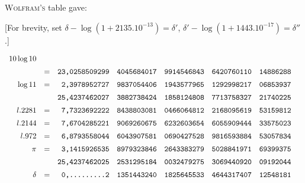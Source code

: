 \textsc{Wolfram's} table gave:

[For brevity, set $\delta-\log(1+2135.10^{-13})=\delta'$,
$\delta'-\log(1+1443.10^{-17})=\delta''$.]

\begingroup\footnotesize\setlength{\arraycolsep}{1pt}\renewcommand{\arraystretch}{1.12}\[
\begin{array}{rcrlllll}
10\log10&&&&&&&\\[5pt]
&=&\text{\ttfamily 23,0258509299}&\text{\ttfamily 4045684017}&\text{\ttfamily 9914546843}&\text{\ttfamily 6420760110}&\text{\ttfamily 14886288}&\\[5pt]
\log11&=&\text{\ttfamily 2,3978952727}&\text{\ttfamily 9837054406}&\text{\ttfamily 1943577965}&\text{\ttfamily 1292998217}&\text{\ttfamily 06853937}&\\[5pt]
&&\text{\ttfamily 25,4237462027}&\text{\ttfamily 3882738424}&\text{\ttfamily 1858124808}&\text{\ttfamily 7713758327}&\text{\ttfamily 21740225}&\\[5pt]
l.2281&=&\text{\ttfamily 7,7323692222}&\text{\ttfamily 8438803081}&\text{\ttfamily 0466064812}&\text{\ttfamily 2168095619}&\text{\ttfamily 53159812}&\\[5pt]
l.2144&=&\text{\ttfamily 7,6704285221}&\text{\ttfamily 9069260675}&\text{\ttfamily 6232603654}&\text{\ttfamily 6055909444}&\text{\ttfamily 33575023}&\\[5pt]
l.972&=&\text{\ttfamily 6,8793558044}&\text{\ttfamily 6043907581}&\text{\ttfamily 0690427528}&\text{\ttfamily 9816593884}&\text{\ttfamily 53057834}&\\[5pt]
\pi&=&\text{\ttfamily 3,1415926535}&\text{\ttfamily 8979323846}&\text{\ttfamily 2643383279}&\text{\ttfamily 5028841971}&\text{\ttfamily 69399375}&\\[5pt]
&&\text{\ttfamily 25,4237462025}&\text{\ttfamily 2531295184}&\text{\ttfamily 0032479275}&\text{\ttfamily 3069440920}&\text{\ttfamily 09192044}&\\[5pt]
\delta&=&\text{\ttfamily 0,.........2}&\text{\ttfamily 1351443240}&\text{\ttfamily 1825645533}&\text{\ttfamily 4644317407}&\text{\ttfamily 12548181}&\\[5pt]

\end{array}\]
